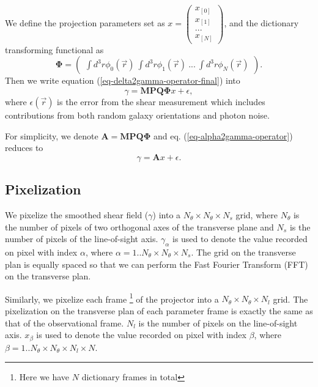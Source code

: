 \documentclass[twocolumn]{aastex62}
\begin{document}
We define the projection parameters set as $x=\begin{pmatrix}
x_{[0]}\\
x_{[1]}\\
...\\
x_{[N]}
\end{pmatrix}$, and the dictionary transforming functional as
\begin{equation}
\mathbf{\Phi}=\begin{pmatrix}
\int d^3r\phi_0(\vec{r}) ~\int d^3r \phi_1(\vec{r})~ ...~\int d^3r \phi_{N}(\vec{r})
\end{pmatrix}.
\end{equation}
Then we write equation (\ref{eq-delta2gamma-operator-final}) into
\begin{equation}\label{eq-alpha2gamma-operator}
\gamma=\mathbf{M}\mathbf{P}\mathbf{Q}\mathbf{\Phi} x +\epsilon,
\end{equation}
where $\epsilon(\vec{r})$ is the error from the shear measurement which includes contributions from both random
galaxy orientations and photon noise.

For simplicity, we denote $\mathbf{A}=\mathbf{M}\mathbf{P}\mathbf{Q}\mathbf{\Phi} $ and eq. (\ref{eq-alpha2gamma-operator})
reduces to 
\begin{equation}\label{eq-x2gamma-simple}
\gamma=\mathbf{A} x +\epsilon.
\end{equation}

\subsection{Pixelization}
\label{subsec:method-pix}
We pixelize the smoothed shear field ($\gamma$) into a $N_\theta \times N_\theta \times N_s$ grid, where $N_\theta$ 
is the number of pixels of two orthogonal axes of the transverse plane and $N_s$ is the number of pixels of the 
line-of-sight axis. $\gamma_{\alpha}$ is used to denote the value recorded on pixel with index $\alpha$, where $\alpha=
1..N_\theta \times N_\theta \times N_s$. The grid on the transverse plan is equally spaced so that we can perform the Fast 
Fourier Transform (FFT) on the transverse plan.

Similarly, we pixelize each frame \footnote{Here we have $N$ dictionary frames in total} of the projector into a $N_\theta 
\times N_\theta \times N_l$ grid. The pixelization on the transverse plan of each parameter frame is exactly the same as 
that of the observational frame. $N_l$ is the number of pixels on the line-of-sight axis. $x_{\beta}$ is used to denote the 
value recorded on pixel with index $\beta$, where $\beta=1..N_\theta \times N_\theta \times N_l \times N$.
\end{document}
